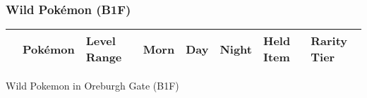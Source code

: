 \subsubsection{Wild Pokémon (B1F)}%
\label{ssubsec:WildPokmon(B1F)}%
\begin{longtable}{||l l l l l l l l||}%
\hline%
\rowcolor{gray}%
&Pokémon&Level Range&Morn&Day&Night&Held Item&Rarity Tier\\%
\hline%
\endhead%
\hline%
\end{longtable}%
\caption{Wild Pokemon in Oreburgh Gate (B1F)}